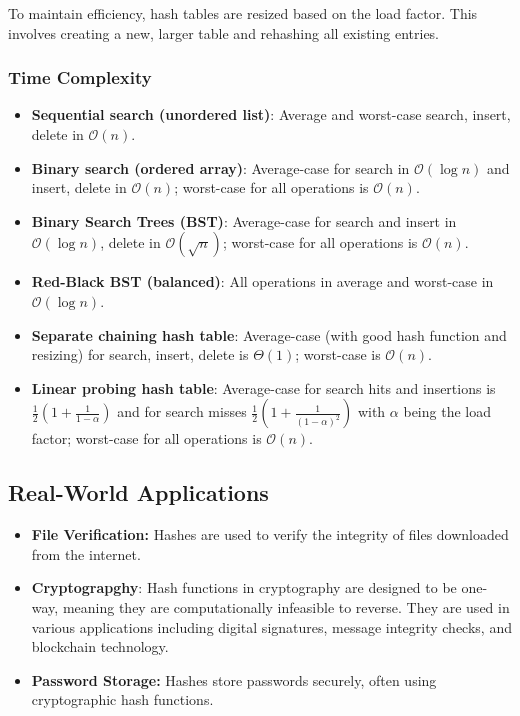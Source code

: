 \documentclass{article}
\begin{document}
To maintain efficiency, hash tables are resized based on the load factor. This involves creating a new, larger table and rehashing all existing entries. 

\subsubsection{Time Complexity}

\begin{itemize}
 \item \textbf{Sequential search (unordered list)}: Average and worst-case search, insert, delete in $\mathcal{O}(n)$.
 \item \textbf{Binary search (ordered array)}: Average-case for search in $\mathcal{O}(\log n)$ and insert, delete in $\mathcal{O}(n)$; worst-case for all operations is $\mathcal{O}(n)$.
 \item \textbf{Binary Search Trees (BST)}: Average-case for search and insert in $\mathcal{O}(\log n)$, delete in $\mathcal{O}(\sqrt{n})$; worst-case for all operations is $\mathcal{O}(n)$.
 \item \textbf{Red-Black BST (balanced)}: All operations in average and worst-case in $\mathcal{O}(\log n)$.
 \item \textbf{Separate chaining hash table}: Average-case (with good hash function and resizing) for search, insert, delete is $\Theta(1)$; worst-case is $\mathcal{O}(n)$.
 \item \textbf{Linear probing hash table}: Average-case for search hits and insertions is $\frac{1}{2}\left(1+\frac{1}{1-\alpha}\right)$ and for search misses $\frac{1}{2}\left(1+\frac{1}{(1-\alpha)^2}\right)$ with $\alpha$ being the load factor; worst-case for all operations is $\mathcal{O}(n)$.
\end{itemize}

\subsection{Real-World Applications}
\begin{itemize}
    \item \textbf{File Verification:} Hashes are used to verify the integrity of files downloaded from the internet.
    \item \textbf{Cryptograpghy}: Hash functions in cryptography are designed to be one-way, meaning they are computationally infeasible to reverse. They are used in various applications including digital signatures, message integrity checks, and blockchain technology.
    \item \textbf{Password Storage:} Hashes store passwords securely, often using cryptographic hash functions.
\end{itemize}
\end{document}

